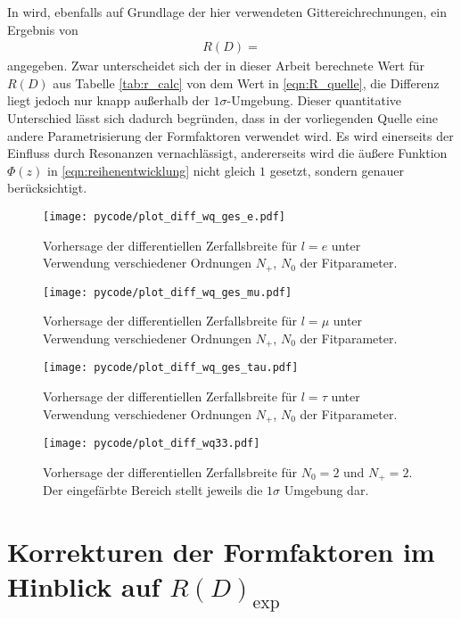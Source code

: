 In \cite{PhysRevD.92.034506} wird, ebenfalls auf Grundlage der hier verwendeten Gittereichrechnungen, ein Ergebnis von
\begin{align}
  \label{eqn:R_quelle}
  R(D) = 
\end{align}
angegeben.
Zwar unterscheidet sich der in dieser Arbeit berechnete Wert für $R(D)$ aus Tabelle \ref{tab:r_calc} von dem Wert in \eqref{eqn:R_quelle}, die Differenz liegt jedoch nur knapp außerhalb der $\num{1}\sigma$-Umgebung.
Dieser quantitative Unterschied lässt sich dadurch begründen, dass in der vorliegenden Quelle eine andere Parametrisierung der Formfaktoren verwendet wird.
Es wird einerseits der Einfluss durch Resonanzen vernachlässigt, andererseits wird die äußere Funktion $\Phi(z)$ in \eqref{eqn:reihenentwicklung} nicht gleich $1$ gesetzt, sondern genauer berücksichtigt.

\begin{figure}
  \centering
  \texttt{[image: pycode/plot\_diff\_wq\_ges\_e.pdf]}
  \caption{Vorhersage der differentiellen Zerfallsbreite für $l=e$ unter Verwendung verschiedener Ordnungen $N_+$, $N_0$ der Fitparameter.}
  \label{fig:difwqe}
\end{figure}
\begin{figure}
  \centering
  \texttt{[image: pycode/plot\_diff\_wq\_ges\_mu.pdf]}
  \caption{Vorhersage der differentiellen Zerfallsbreite für $l=\mu$ unter Verwendung verschiedener Ordnungen $N_+$, $N_0$ der Fitparameter.}
  \label{fig:difwqmu}
\end{figure}
\begin{figure}
  \centering
  \texttt{[image: pycode/plot\_diff\_wq\_ges\_tau.pdf]}
  \caption{Vorhersage der differentiellen Zerfallsbreite für $l=\tau$ unter Verwendung verschiedener Ordnungen $N_+$, $N_0$ der Fitparameter.}
  \label{fig:difwqtau}
\end{figure}
\begin{figure}
  \centering
  \texttt{[image: pycode/plot\_diff\_wq33.pdf]}
  \caption{Vorhersage der differentiellen Zerfallsbreite für $N_0 = \num{2}$ und $N_+ = \num{2}$. Der eingefärbte Bereich stellt jeweils die $\num{1}\sigma$ Umgebung dar.}
  \label{fig:difwq33}
\end{figure}

\section{Korrekturen der Formfaktoren im Hinblick auf \texorpdfstring{${R(D)_\mathrm{exp}}$}{R(D)_exp}}

